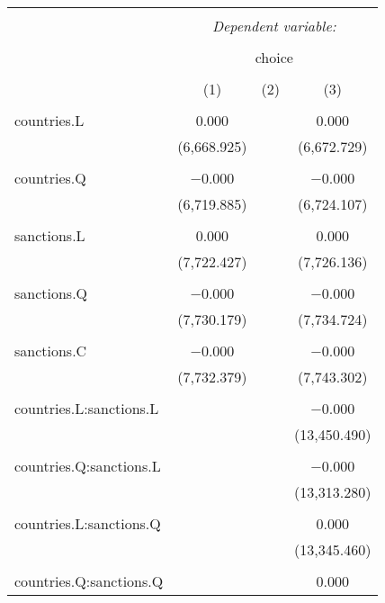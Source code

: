 
\begin{table}[!htbp] \centering 
  \caption{} 
  \label{} 
\begin{tabular}{@{\extracolsep{5pt}}lccc} 
\\[-1.8ex]\hline 
\hline \\[-1.8ex] 
 & \multicolumn{3}{c}{\textit{Dependent variable:}} \\ 
\cline{2-4} 
\\[-1.8ex] & \multicolumn{3}{c}{choice} \\ 
\\[-1.8ex] & (1) & (2) & (3)\\ 
\hline \\[-1.8ex] 
 countries.L & 0.000 &  & 0.000 \\ 
  & (6,668.925) &  & (6,672.729) \\ 
  & & & \\ 
 countries.Q & $-$0.000 &  & $-$0.000 \\ 
  & (6,719.885) &  & (6,724.107) \\ 
  & & & \\ 
 sanctions.L & 0.000 &  & 0.000 \\ 
  & (7,722.427) &  & (7,726.136) \\ 
  & & & \\ 
 sanctions.Q & $-$0.000 &  & $-$0.000 \\ 
  & (7,730.179) &  & (7,734.724) \\ 
  & & & \\ 
 sanctions.C & $-$0.000 &  & $-$0.000 \\ 
  & (7,732.379) &  & (7,743.302) \\ 
  & & & \\ 
 countries.L:sanctions.L &  &  & $-$0.000 \\ 
  &  &  & (13,450.490) \\ 
  & & & \\ 
 countries.Q:sanctions.L &  &  & $-$0.000 \\ 
  &  &  & (13,313.280) \\ 
  & & & \\ 
 countries.L:sanctions.Q &  &  & 0.000 \\ 
  &  &  & (13,345.460) \\ 
  & & & \\ 
 countries.Q:sanctions.Q &  &  & 0.000 \\ 

\end{tabular}
\end{table}
